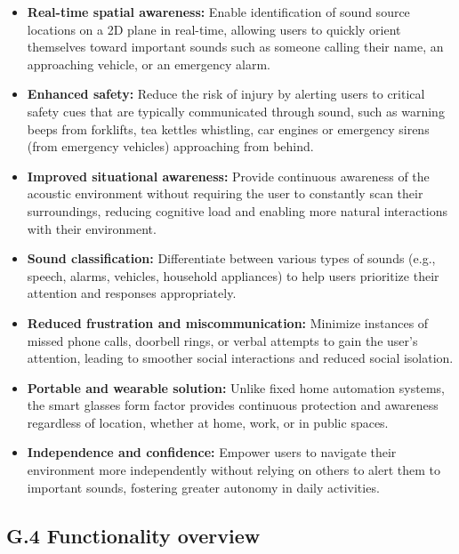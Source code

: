 \documentclass[12pt]{article}
\theoremstyle{definition}
\begin{document}
\begin{itemize}
\item \textbf{Real-time spatial awareness:} Enable identification of sound
source locations on a 2D plane in real-time, allowing users to quickly
orient themselves toward important sounds such as someone calling their name,
an approaching vehicle, or an emergency alarm.

\item \textbf{Enhanced safety:} Reduce the risk of injury by alerting users
to critical safety cues that are typically communicated through sound, such
as warning beeps from forklifts, tea kettles whistling, car engines
or emergency sirens (from emergency vehicles) approaching from behind.

\item \textbf{Improved situational awareness:} Provide continuous awareness
of the acoustic environment without requiring the user to constantly scan
their surroundings, reducing cognitive load and enabling more natural
interactions with their environment.

\item \textbf{Sound classification:} Differentiate between various types of
sounds (e.g., speech, alarms, vehicles, household appliances) to help users
prioritize their attention and responses appropriately.

\item \textbf{Reduced frustration and miscommunication:} Minimize instances
of missed phone calls, doorbell rings, or verbal attempts to gain the user's
attention, leading to smoother social interactions and reduced social
isolation.

\item \textbf{Portable and wearable solution:} Unlike fixed home automation
systems, the smart glasses form factor provides continuous protection and
awareness regardless of location, whether at home, work, or in public spaces.

\item \textbf{Independence and confidence:} Empower users to navigate their
environment more independently without relying on others to alert them to
important sounds, fostering greater autonomy in daily activities.
\end{itemize}



\subsection{G.4 Functionality overview}
\end{document}
